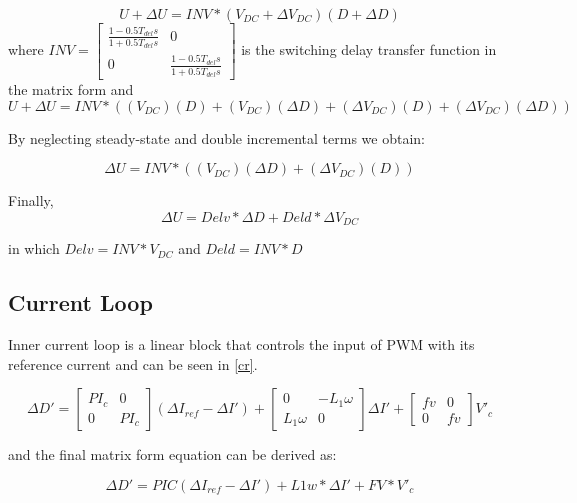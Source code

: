 \begin{equation}\label{PWM2}
 U+\Delta U=INV*(V_{DC}+\Delta V_{DC})(D+ \Delta D)
\end{equation}
where $INV=\begin{bmatrix}\frac{1-0.5T_{del}s}{1+0.5T_{del}s} & 0 \\ 0 & \frac{1-0.5T_{del}s}{1+0.5T_{del}s}\end{bmatrix}$ is the switching delay transfer function in the matrix form and
\begin{equation}\label{PWM2}
 U+\Delta U=INV*((V_{DC})(D)+(V_{DC})(\Delta D)+(\Delta V_{DC})(D)+(\Delta V_{DC})(\Delta D))
\end{equation}

By neglecting steady-state and double incremental terms we obtain:

\begin{equation}\label{PWM2}
\Delta U=INV*((V_{DC})(\Delta D)+(\Delta V_{DC})(D))
\end{equation}

Finally,
\begin{equation}\label{PWM3}
\Delta U=Delv*\Delta D+Deld*\Delta V_{DC}
\end{equation}

in which $Delv=INV*V_{DC}$ and $Deld=INV*D$

\subsection{Current Loop}
Inner current loop is a linear block that controls the input of PWM with its reference current and can be seen in \ref{cr}.

\begin{equation}\label{cr}
\Delta D'=\begin{bmatrix}PI_c & 0 \\ 0 & PI_c \end{bmatrix}(\Delta I_{ref}-\Delta I')+\begin{bmatrix}0 & -L_1\omega \\ L_1\omega & 0 \end{bmatrix}\Delta I'+\begin{bmatrix}fv & 0 \\ 0 & fv \end{bmatrix}V'_c
\end{equation}

and the final matrix form equation can be derived as:

\begin{equation}\label{cr2}
\Delta D'=PIC(\Delta I_{ref}-\Delta I')+L1w*\Delta I'+FV*V'_c
\end{equation}

